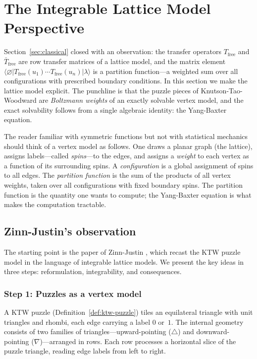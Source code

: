 
\section{The Integrable Lattice Model Perspective}
\label{sec:lattice}

Section~\ref{sec:classical} closed with an observation: the transfer
operators $T_{\mathrm{free}}$ and $\bar{T}_{\mathrm{free}}$ are row
transfer matrices of a lattice model, and the matrix element
$\langle\varnothing|T_{\mathrm{free}}(u_1)\cdots
T_{\mathrm{free}}(u_n)|\lambda\rangle$ is a partition function---a
weighted sum over all configurations with prescribed boundary
conditions.  In this section we make the lattice model explicit.
The punchline is that the puzzle pieces of Knutson-Tao-Woodward are
\emph{Boltzmann weights} of an exactly solvable vertex model, and the
exact solvability follows from a single algebraic identity: the
Yang-Baxter equation.

The reader familiar with symmetric functions but not with statistical
mechanics should think of a vertex model as follows.  One draws a
planar graph (the lattice), assigns labels---called
\emph{spins}---to the edges, and assigns a \emph{weight} to each
vertex as a function of its surrounding spins.  A \emph{configuration}
is a global assignment of spins to all edges.  The \emph{partition
function} is the sum of the products of all vertex weights, taken over
all configurations with fixed boundary spins.  The partition function
is the quantity one wants to compute; the Yang-Baxter equation is what
makes the computation tractable.

\subsection{Zinn-Justin's observation}
\label{sec:lattice-zj}

The starting point is the paper of Zinn-Justin
\cite{zinn-justin-2008}, which recast the KTW puzzle model in the
language of integrable lattice models.  We present the key ideas in
three steps: reformulation, integrability, and consequences.

\subsubsection*{Step 1: Puzzles as a vertex model}

A KTW puzzle (Definition~\ref{def:ktw-puzzle}) tiles an equilateral
triangle with unit triangles and rhombi, each edge carrying a label
$0$ or~$1$.  The internal geometry consists of two families of
triangles---upward-pointing ($\triangle$) and downward-pointing
($\nabla$)---arranged in rows.  Each row processes a horizontal slice
of the puzzle triangle, reading edge labels from left to right.

